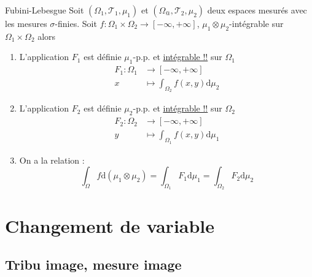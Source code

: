 \begin{Theorem}{Fubini-Lebesgue}{}
  Soit $(\Omega_1, \mathcal{T}_1, \mu_1)$ et $(\Omega_@, \mathcal{T}_2, \mu_2)$ deux espaces mesurés avec les mesures $\sigma$-finies. Soit $f: \Omega_1 \times \Omega_2 \to [-\infty, +\infty]$, $\mu_1 \otimes \mu_2$-intégrable sur $\Omega_1 \times \Omega_2$ alors 
  \begin{enumerate}

    \item L'application $F_1$ est définie $\mu_1$-p.p. et \underline{intégrable !!} sur $\Omega_1$
      \begin{align}
        F_1 : \Omega_1 &\to [-\infty, + \infty] \\ 
        x &\mapsto \int_{\Omega_2}^{} f(x, y) \mathrm{d}\mu_2
      \end{align}

    \item L'application $F_2$ est définie $\mu_2$-p.p. et \underline{intégrable !!} sur $\Omega_2$
      \begin{align}
        F_2 : \Omega_2 &\to [-\infty, + \infty] \\ 
        y &\mapsto \int_{\Omega_1}^{} f(x, y) \mathrm{d}\mu_1
      \end{align}

    \item On a la relation : 
      \begin{equation}
        \int_{\Omega}^{} f \mathrm{d}(\mu_1 \otimes \mu_2) = \int_{\Omega_1}^{} F_1 \mathrm{d}\mu_1 = \int_{\Omega_2}^{} F_2 \mathrm{d}\mu_2
      \end{equation}

  \end{enumerate}
\end{Theorem}









\newpage
\section{Changement de variable} %
\label{sec:Changement de variable}

\subsection{Tribu image, mesure image} %
\label{sub:Tribu image, mesure image}

